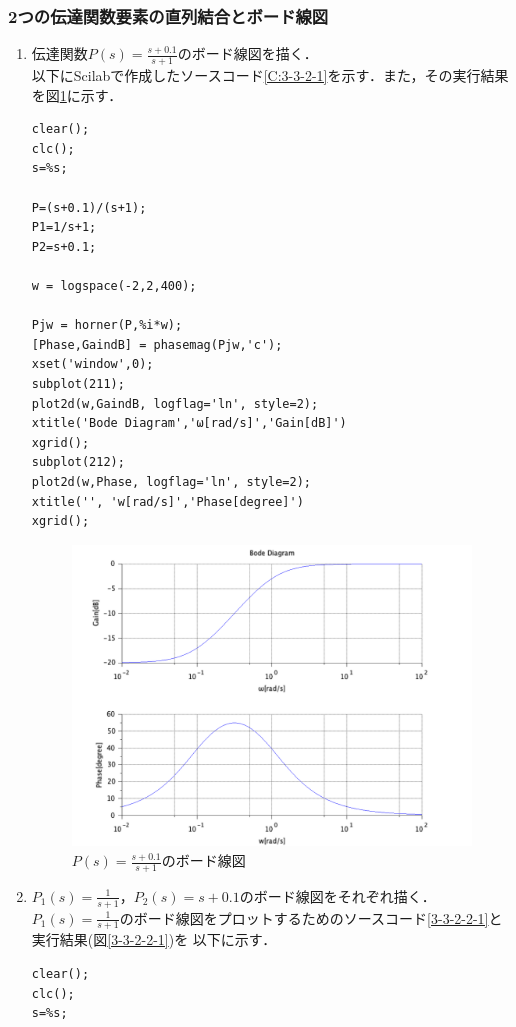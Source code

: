 \documentclass[a4paper,11pt]{jsarticle}
\begin{document}
    \subsubsection{2つの伝達関数要素の直列結合とボード線図}
    \begin{enumerate}
      \item 伝達関数$P(s)=\frac{s+0.1}{s+1}$のボード線図を描く．\\
      以下にScilabで作成したソースコード\ref{C:3-3-2-1}を示す．また，その実行結果を図\ref{3-3-2-1}に示す．
      \begin{lstlisting}[caption=図\ref{3-3-2-1}をプロットするコード, label=C:3-3-2-1]
clear();
clc();
s=%s;

P=(s+0.1)/(s+1);
P1=1/s+1;
P2=s+0.1;

w = logspace(-2,2,400);

Pjw = horner(P,%i*w);
[Phase,GaindB] = phasemag(Pjw,'c');
xset('window',0);
subplot(211);
plot2d(w,GaindB, logflag='ln', style=2);
xtitle('Bode Diagram','ω[rad/s]','Gain[dB]')
xgrid();
subplot(212);
plot2d(w,Phase, logflag='ln', style=2);
xtitle('', 'w[rad/s]','Phase[degree]')
xgrid();
      \end{lstlisting}
      \begin{figure}[H]
        \centering
        \includegraphics[width=0.8\linewidth]{picture/kadai7-1.png}
        \caption{$P(s)=\frac{s+0.1}{s+1}$のボード線図}
        \label{3-3-2-1}
      \end{figure}

      \item $P_1(s)=\frac{1}{s+1}$，$P_2(s)=s+0.1$のボード線図をそれぞれ描く．\\
      $P_1(s)=\frac{1}{s+1}$のボード線図をプロットするためのソースコード\ref{3-3-2-2-1}と実行結果(図\ref{3-3-2-2-1})を
      以下に示す．
      \begin{lstlisting}[caption=図\ref{3-3-2-2-1}をプロットするコード, label=C:3-3-2-2-1]
clear();
clc();
s=%s;


\end{lstlisting}
\end{enumerate}
\end{document}
